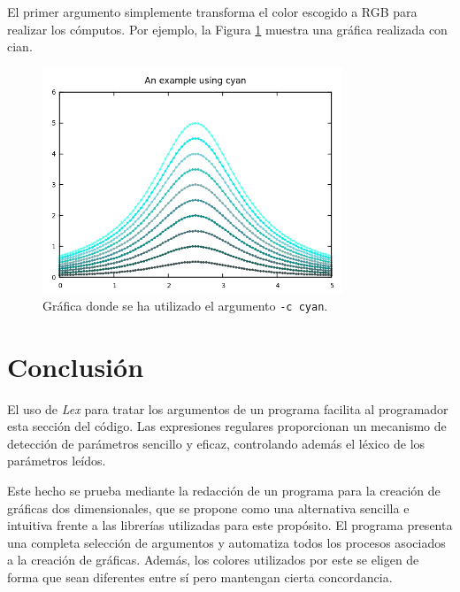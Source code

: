 \documentclass{article}
\begin{document}
		El primer argumento simplemente transforma el color escogido a RGB para realizar los cómputos. Por ejemplo, la Figura \ref{fig:color} muestra una gráfica realizada con cian.

		\begin{figure}[H]
	       	\centering
	       	\includegraphics[width=0.8\textwidth]{../../images/example_cyan.png}
	       	\caption{Gráfica donde se ha utilizado el argumento \texttt{-c cyan}.}
	       	\label{fig:color}
		\end{figure}


	\section{Conclusión}

		El uso de \textit{Lex} para tratar los argumentos de un programa facilita al programador esta sección del código. Las expresiones regulares proporcionan un mecanismo de detección de parámetros sencillo y eficaz, controlando además el léxico de los parámetros leídos.
	
		Este hecho se prueba mediante la redacción de un programa para la creación de gráficas dos dimensionales, que se propone como una alternativa sencilla e intuitiva frente a las librerías utilizadas para este propósito. El programa presenta una completa selección de argumentos y automatiza todos los procesos asociados a la creación de gráficas. Además, los colores utilizados por este se eligen de forma que sean diferentes entre sí pero mantengan cierta concordancia.
	
\end{document}
